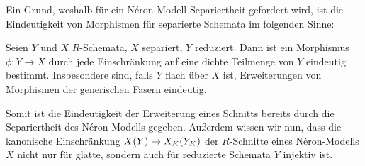 Ein Grund, weshalb für ein Néron-Modell Separiertheit gefordert wird,
ist die Eindeutigkeit von Morphismen für separierte Schemata im
folgenden Sinne:
\begin{Satz}\label{thm:erweindeutig}
  Seien $Y$ und $X$ $R$-Schemata, $X$ separiert, $Y$
  reduziert.
  Dann ist ein Morphismus $\phi\colon Y\to X$ durch jede
  Einschränkung auf eine dichte Teilmenge von $Y$ eindeutig bestimmt.
  Insbesondere sind, falls $Y$ flach über $X$ ist, Erweiterungen von
  Morphismen der generischen Fasern eindeutig.

\end{Satz}
Somit ist die Eindeutigkeit der Erweiterung eines Schnitts bereits
durch die Separiertheit des Néron-Modells gegeben. Außerdem wissen wir
nun, dass die kanonische Einschränkung $X(Y)\to X_{K}(Y_{K})$ der
$R$-Schnitte eines Néron-Modells $X$ nicht nur für glatte, sondern
auch für reduzierte Schemata $Y$ injektiv ist.

